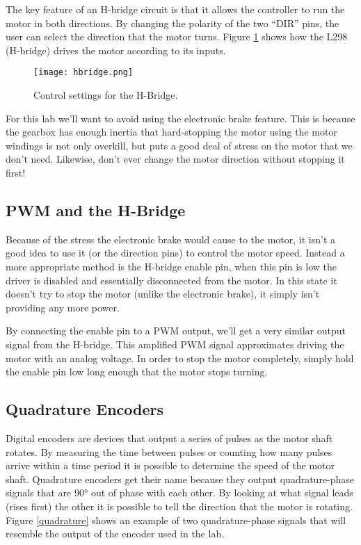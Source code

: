 \documentclass[11pt,fleqn]{book} %
\begin{document}
The key feature of an H-bridge circuit is that it allows the controller to run the motor in both directions. By changing the polarity of the two ``DIR'' pins, the user can select the direction that the motor turns. Figure \ref{hbridge} shows how the L298 (H-bridge) drives the motor according to its inputs.

\begin{figure}[b]
    \centering\texttt{[image: hbridge.png]}
    \caption{Control settings for the H-Bridge.}
    \label{hbridge}
\end{figure}

For this lab we'll want to avoid using the electronic brake feature. This is because the gearbox has enough inertia that hard-stopping the motor using the motor windings is not only overkill, but puts a good deal of stress on the motor that we don't need. Likewise, don't ever change the motor direction without stopping it first! 

\subsection{PWM and the H-Bridge}
Because of the stress the electronic brake would cause to the motor, it isn't a good idea to use it (or the direction pins) to control the motor speed. Instead a more appropriate method is the H-bridge enable pin, when this pin is low the driver is disabled and essentially disconnected from the motor. In this state it doesn't try to stop the motor (unlike the electronic brake), it simply isn't providing any more power.

\noindent By connecting the enable pin to a PWM output, we'll get a very similar output signal from the H-bridge. This amplified PWM signal approximates driving the motor with an analog voltage. In order to stop the motor completely, simply hold the enable pin low long enough that the motor stops turning. 

\subsection{Quadrature Encoders}

Digital encoders are devices that output a series of pulses as the motor shaft rotates. By measuring the time between pulses or counting how many pulses arrive within a time period it is possible to determine the speed of the motor shaft. Quadrature encoders get their name because they output quadrature-phase signals that are 90° out of phase with each other. By looking at what signal leads (rises first) the other it is possible to tell the direction that the motor is rotating. Figure \ref{quadrature} shows an example of two quadrature-phase signals that will resemble the output of the encoder used in the lab.
\end{document}
